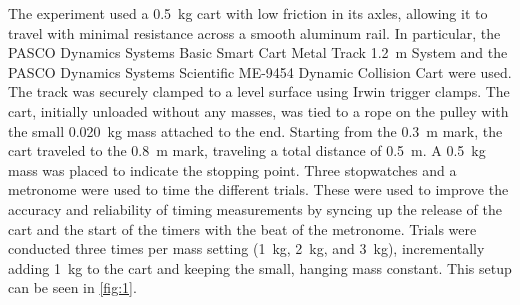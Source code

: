 \documentclass[reprint,amsmath,amssymb,aps]{revtex4-2}
\begin{document}
The experiment used a \qty{0.5}{\kilo\gram} cart with low friction in its axles, allowing it to travel with minimal resistance across a smooth aluminum rail. In particular, the PASCO Dynamics Systems Basic Smart Cart Metal Track \qty{1.2}{\meter} System and the PASCO Dynamics Systems Scientific ME-9454 Dynamic Collision Cart were used. The track was securely clamped to a level surface using Irwin trigger clamps. The cart, initially unloaded without any masses, was tied to a rope on the pulley with the small \qty{0.020}{\kilo\gram} mass attached to the end. Starting from the \qty{0.3}{\meter} mark, the cart traveled to the \qty{0.8}{\meter} mark, traveling a total distance of \qty{0.5}{\meter}. A \qty{0.5}{\kilo\gram} mass was placed to indicate the stopping point. Three stopwatches and a metronome were used to time the different trials. These were used to improve the accuracy and reliability of timing measurements by syncing up the release of the cart and the start of the timers with the beat of the metronome. Trials were conducted three times per mass setting (\qty{1}{\kilo\gram}, \qty{2}{\kilo\gram}, and \qty{3}{\kilo\gram}), incrementally adding \qty{1}{\kilo\gram} to the cart and keeping the small, hanging mass constant. This setup can be seen in \cref{fig:1}.
\end{document}
